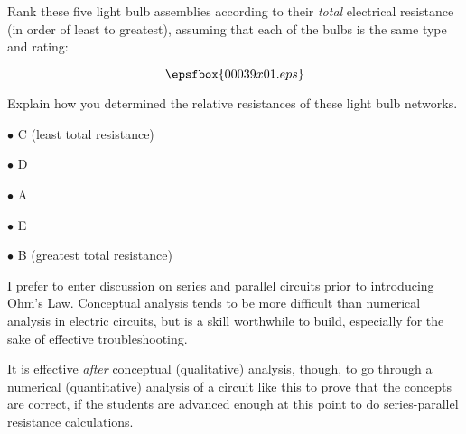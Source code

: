 

Rank these five light bulb assemblies according to their {\it total} electrical resistance (in order of least to greatest), assuming that each of the bulbs is the same type and rating:

$$\epsfbox{00039x01.eps}$$

Explain how you determined the relative resistances of these light bulb networks.







\medskip
\item{$\bullet$} C (least total resistance)
\item{$\bullet$} D
\item{$\bullet$} A
\item{$\bullet$} E
\item{$\bullet$} B (greatest total resistance)
\medskip







I prefer to enter discussion on series and parallel circuits prior to introducing Ohm's Law.  Conceptual analysis tends to be more difficult than numerical analysis in electric circuits, but is a skill worthwhile to build, especially for the sake of effective troubleshooting.

It is effective {\it after} conceptual (qualitative) analysis, though, to go through a numerical (quantitative) analysis of a circuit like this to prove that the concepts are correct, if the students are advanced enough at this point to do series-parallel resistance calculations.




